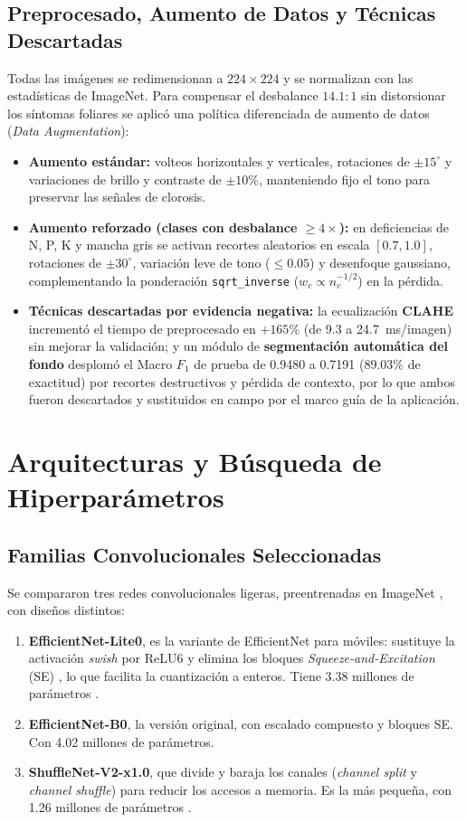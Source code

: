 \subsection{Preprocesado, Aumento de Datos y T\'ecnicas Descartadas}
Todas las im\'agenes se redimensionan a $224\times224$ y se normalizan con las estad\'isticas de ImageNet. Para compensar el desbalance $14.1:1$ sin distorsionar los s\'intomas foliares se aplic\'o una pol\'itica diferenciada de aumento de datos (\textit{Data Augmentation}):
\begin{itemize}\setlength{\itemsep}{2pt}
\item \textbf{Aumento est\'andar:} volteos horizontales y verticales, rotaciones de $\pm 15^\circ$ y variaciones de brillo y contraste de $\pm 10\%$, manteniendo fijo el tono para preservar las se\~nales de clorosis.
\item \textbf{Aumento reforzado (clases con desbalance $\ge 4\times$):} en deficiencias de N, P, K y mancha gris se activan recortes aleatorios en escala $[0.7, 1.0]$, rotaciones de $\pm 30^\circ$, variaci\'on leve de tono ($\le 0.05$) y desenfoque gaussiano, complementando la ponderaci\'on \texttt{sqrt\_inverse} ($w_c \propto n_c^{-1/2}$) en la p\'erdida.
\item \textbf{T\'ecnicas descartadas por evidencia negativa:} la ecualizaci\'on \textbf{CLAHE} increment\'o el tiempo de preprocesado en $+165\%$ (de 9.3 a 24.7~ms/imagen) sin mejorar la validaci\'on; y un m\'odulo de \textbf{segmentaci\'on autom\'atica del fondo} desplom\'o el Macro $F_1$ de prueba de 0.9480 a 0.7191 (89.03\% de exactitud) por recortes destructivos y p\'erdida de contexto, por lo que ambos fueron descartados y sustituidos en campo por el marco gu\'ia de la aplicaci\'on.
\end{itemize}

\section{Arquitecturas y B\'usqueda de Hiperpar\'ametros}

\subsection{Familias Convolucionales Seleccionadas}
Se compararon tres redes convolucionales ligeras, preentrenadas en ImageNet \cite{deng2009}, con dise\~nos distintos:
\begin{enumerate}
\item \textbf{EfficientNet-Lite0}, es la variante de EfficientNet para m\'oviles: sustituye la activaci\'on \textit{swish} por ReLU6 y elimina los bloques \textit{Squeeze-and-Excitation} (SE) \cite{hu2018}, lo que facilita la cuantizaci\'on a enteros. Tiene 3.38 millones de par\'ametros \cite{tan2019}.
\item \textbf{EfficientNet-B0}, la versi\'on original, con escalado compuesto y bloques SE. Con 4.02 millones de par\'ametros.
\item \textbf{ShuffleNet-V2-x1.0}, que divide y baraja los canales (\textit{channel split} y \textit{channel shuffle}) para reducir los accesos a memoria. Es la m\'as peque\~na, con 1.26 millones de par\'ametros \cite{ma2018}.
\end{enumerate}

